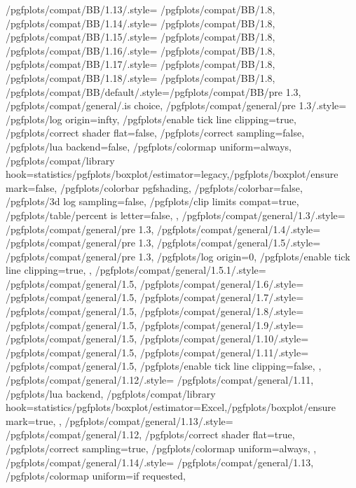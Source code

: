 {	/pgfplots/compat/BB/1.13/.style=	{/pgfplots/compat/BB/1.8},%
	/pgfplots/compat/BB/1.14/.style=	{/pgfplots/compat/BB/1.8},%
	/pgfplots/compat/BB/1.15/.style=	{/pgfplots/compat/BB/1.8},%
	/pgfplots/compat/BB/1.16/.style=	{/pgfplots/compat/BB/1.8},%
	/pgfplots/compat/BB/1.17/.style=	{/pgfplots/compat/BB/1.8},%
	/pgfplots/compat/BB/1.18/.style=	{/pgfplots/compat/BB/1.8},%
	/pgfplots/compat/BB/default/.style={/pgfplots/compat/BB/pre 1.3},
	/pgfplots/compat/general/.is choice,
	/pgfplots/compat/general/pre 1.3/.style={
		/pgfplots/log origin=infty,
		/pgfplots/enable tick line clipping=true,
		/pgfplots/correct shader flat=false,
		/pgfplots/correct sampling=false,
		/pgfplots/lua backend=false,
		/pgfplots/colormap uniform=always,
		/pgfplots/compat/library hook={statistics}{/pgfplots/boxplot/estimator=legacy,/pgfplots/boxplot/ensure mark=false},
		/pgfplots/colorbar pgfshading,
		/pgfplots/colorbar=false,
		/pgfplots/3d log sampling=false,
		/pgfplots/clip limits compat=true,
		/pgfplots/table/percent is letter=false,
	},%
	/pgfplots/compat/general/1.3/.style=	{/pgfplots/compat/general/pre 1.3},
	/pgfplots/compat/general/1.4/.style=	{/pgfplots/compat/general/pre 1.3},%
	/pgfplots/compat/general/1.5/.style=	{
		/pgfplots/compat/general/pre 1.3,
		/pgfplots/log origin=0,
		/pgfplots/enable tick line clipping=true,
	},%
	/pgfplots/compat/general/1.5.1/.style=	{/pgfplots/compat/general/1.5},%
	/pgfplots/compat/general/1.6/.style=	{/pgfplots/compat/general/1.5},%
	/pgfplots/compat/general/1.7/.style=	{/pgfplots/compat/general/1.5},%
	/pgfplots/compat/general/1.8/.style=	{/pgfplots/compat/general/1.5},%
	/pgfplots/compat/general/1.9/.style=	{/pgfplots/compat/general/1.5},%
	/pgfplots/compat/general/1.10/.style=	{/pgfplots/compat/general/1.5},%
	/pgfplots/compat/general/1.11/.style=	{
		/pgfplots/compat/general/1.5,
		/pgfplots/enable tick line clipping=false,
	},%
	/pgfplots/compat/general/1.12/.style=	{
		/pgfplots/compat/general/1.11,
		/pgfplots/lua backend,
		/pgfplots/compat/library hook={statistics}{/pgfplots/boxplot/estimator=Excel,/pgfplots/boxplot/ensure mark=true},
	},%
	/pgfplots/compat/general/1.13/.style=	{%
		/pgfplots/compat/general/1.12,
		/pgfplots/correct shader flat=true,
		/pgfplots/correct sampling=true,
		/pgfplots/colormap uniform=always,
	},%
	/pgfplots/compat/general/1.14/.style=	{%
		/pgfplots/compat/general/1.13,
		/pgfplots/colormap uniform=if requested,
}}
